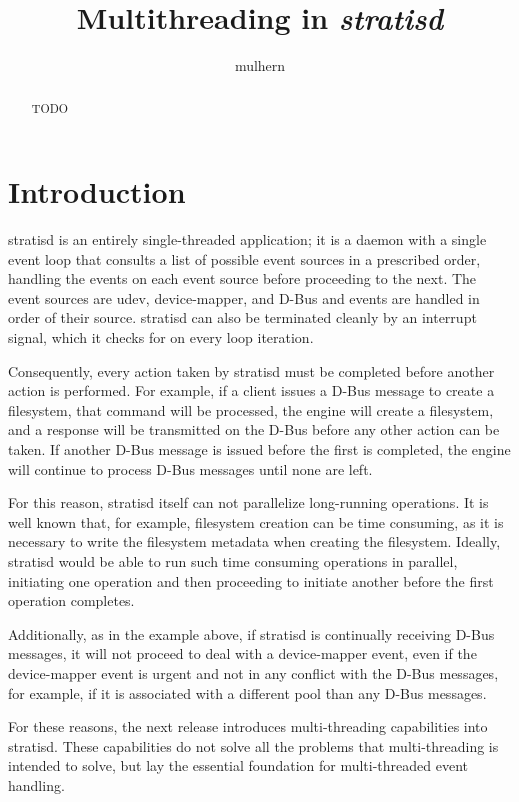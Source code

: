 \documentclass[]{article}
\title{Multithreading in \emph{stratisd}}
\author{mulhern}
\begin{document}
\maketitle

\begin{abstract}
TODO
\end{abstract}

\section{Introduction}
stratisd is an entirely single-threaded application; it is a daemon with a single event loop that consults a list of possible event sources in a prescribed order, handling the events on each event source before proceeding to the next. The event sources are udev, device-mapper, and D-Bus and events are handled in order of their source. stratisd can also be terminated cleanly by an interrupt signal, which it checks for on every loop iteration.

Consequently, every action taken by stratisd must be completed before another action is performed. For example, if a client issues a D-Bus message to create a filesystem, that command will be processed, the engine will create a filesystem, and a response will be transmitted on the D-Bus before any other action can be taken. If another D-Bus message is issued before the first is completed, the engine will continue to process D-Bus messages until none are left.

For this reason, stratisd itself can not parallelize long-running operations. It is well known that, for example, filesystem creation can be time consuming, as it is necessary to write the filesystem metadata when creating the filesystem. Ideally, stratisd would be able to run such time consuming operations in parallel, initiating one operation and then proceeding to initiate another before the first operation completes.

Additionally, as in the example above, if stratisd is continually receiving D-Bus messages, it will not proceed to deal with a device-mapper event, even if the device-mapper event is urgent and not in any conflict with the D-Bus messages, for example, if it is associated with a different pool than any D-Bus messages.

For these reasons, the next release introduces multi-threading capabilities into stratisd. These capabilities do not solve all the problems that multi-threading is intended to solve, but lay the essential foundation for multi-threaded event handling.
\end{document}
